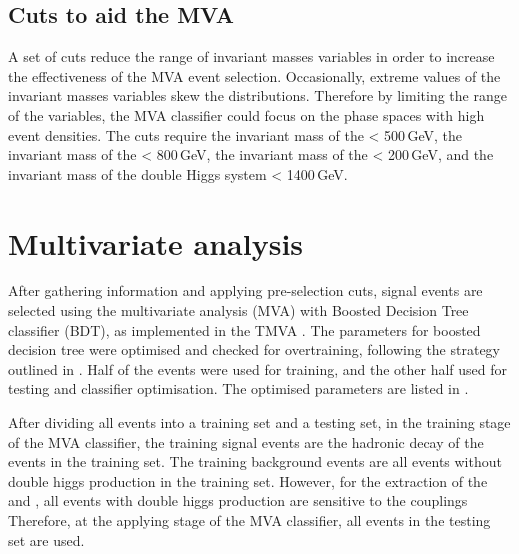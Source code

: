 \subsection{Cuts to aid the MVA}

A set of cuts reduce the range of invariant masses variables in order to increase the effectiveness of the MVA event selection. Occasionally, extreme values of the invariant masses variables skew the distributions. Therefore by limiting the range of the variables, the MVA classifier could focus on the phase spaces with high event densities. The cuts require the invariant mass of the \Hbb < 500\,GeV, the invariant mass of the \HWW < 800\,GeV, the invariant mass of the \PW < 200\,GeV, and the invariant mass of the double Higgs system < 1400\,GeV.



\section{Multivariate analysis}
\label{sec:doubleHiggsMVA}
After gathering information and applying  pre-selection cuts, signal events are selected using the multivariate analysis (MVA) with Boosted Decision Tree classifier (BDT), as implemented in the TMVA \cite{Hocker:2007ht}. The parameters for boosted decision tree were optimised and checked for overtraining, following the strategy outlined in . Half of the events were used for training, and the other half used for testing and classifier optimisation. The optimised parameters are listed in .

After dividing all events into a training set and a testing set, in the training stage of the MVA classifier, the training signal events are the  hadronic \WW decay of the \eeToHHbbWW events in the training set. The training background events are all events without double higgs production  in the training set. However, for the extraction of the \gHHH and \gWWHH,  all events with double higgs production are sensitive to the couplings Therefore, at the applying stage of the MVA classifier, all events in the testing set are used.




